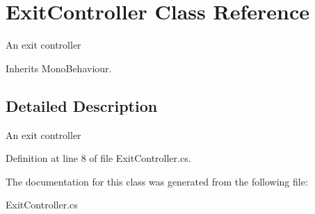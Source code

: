 \hypertarget{class_exit_controller}{}\section{Exit\+Controller Class Reference}
\label{class_exit_controller}


An exit controller  




Inherits Mono\+Behaviour.



\subsection{Detailed Description}
An exit controller 



Definition at line 8 of file Exit\+Controller.\+cs.



The documentation for this class was generated from the following file\+:\begin{DoxyCompactItemize}
\item 
Exit\+Controller.\+cs\end{DoxyCompactItemize}
